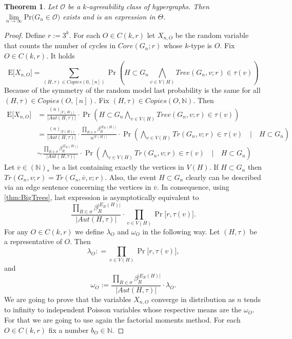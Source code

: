 \documentclass[12pt,notitlepage,a4paper]{article}
\newtheorem{theorem}{Theorem}[section]
\theoremstyle{definition}
\newcommand{\N}{\mathbb{N}}
\newcommand{\Ln}{\lim\limits_{n\to \infty}}
\newcommand{\PR}[1]{\mathrm{Pr}\big(#1\big)}
\begin{document}
\begin{theorem}
	Let $\mathcal{O}$ be a $k$-agreeability class
	of hypergraphs. Then 
	$\Ln \PR{G_n\in \mathcal{O}}$ exists and is an expression
	in $\Theta$. 
\end{theorem}
\begin{proof}
	Define $r:=3^k$. 
	For each $O\in C(k,r)$ let $X_{n,O}$ be the random variable
	that counts the number of cycles in $Core(G_n;r)$ 
	whose $k$-type is $O$. Fix $O\in C(k,r)$. It holds
	\[
	\mathrm{E}\big[ X_{n,O}\big]
	=\sum_{(H,\tau)\in Copies(0,[n])} \Pr\left(
	H\subset G_n \bigwedge_{v\in V(H)} 
	Tree(G_n, v;r)\in \tau(v)
	\right)	
	\]
	Because of the symmetry of the random model last probability is the 
	same for all $(H,\tau)\in Copies(O,[n])$. Fix $(H,\tau)\in
	Copies(O,\N )$. Then
	\begin{align*}
	\mathrm{E}\big[ X_{n,O}\big]
	&=\frac{(n)_{|V(H)|}}{|Aut(H,\tau)|} 
	\cdot \Pr\left(
	H\subset G_n \bigwedge_{v\in V(H)} 
	Tree(G_n, v;r)\in \tau(v)
	\right)	\\
	&=\frac{(n)_{|V(H)|}}{|Aut(H,\tau)|}\cdot
	\frac{\prod_{R\in \sigma} \beta_R^{|E_R(H)|}}{n^{|V(H)|}}\cdot
	\Pr\left(\bigwedge_{v\in V(H)} 
	Tr(G_n, v;r)\in \tau(v)
	\quad  \Big| \quad H\subset G_n
	\right)\\
	&\sim 
	\frac{\prod_{R\in \sigma} \beta_R^{|E_R(H)|}}
	{|Aut(H,\tau)|}\cdot
	\Pr\left(\bigwedge_{v\in V(H)} 
	Tr(G_n, v;r)\in \tau(v)
	\quad  \Big| \quad H\subset G_n
	\right)
	\end{align*}
	Let $\overline{v}\in (\N)_*$ be a list containing 
	exactly the vertices in $V(H)$. If $H\subset G_n$
	then $Tr(G_n, v;r)=Tr(G_n,\overline{v},v;r)$. Also,
	the event $H\subset G_n$ clearly can be described via
	an edge sentence concerning the vertices in $\overline{v}$.
	In consequence, using \cref{thm:BigTrees}, last expression
	is asymptotically equivalent to
	\[
	\frac{\prod_{R\in \sigma} \beta_R^{|E_R(H)|}}
	{|Aut(H,\tau)|}\cdot
	\prod_{v\in V(H)}
	\Pr \big[ r, \tau(v) \big].
	\]
	For any $O\in C(k,r)$ we define $\lambda_O$ and 
	$\omega_O$ in the following way. Let $(H,\tau)$ be
	a representative of $O$. Then
	\[ 
	\lambda_O:
	=\prod_{v\in V(H)}
	\Pr \big[ r, \tau(v) \big],
	\]
	and
	\[
	\omega_O:=
	\frac{\prod_{R\in \sigma} \beta_R^{|E_R(H)|}}
	{|Aut(H,\tau)|}\cdot\lambda_O.
	\]
	We are going to prove that the variables $X_{n,O}$ converge
	in distribution as $n$ tends to infinity to 
	independent Poisson variables whose respective means are
	the $\omega_O$. For that we are going to use again the factorial 
	moments method. For each $O\in C(k,r)$ fix a number $b_{O}\in\N$.

\end{proof}
\end{document}
